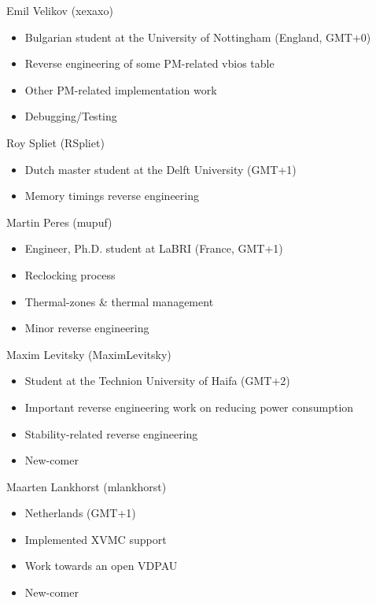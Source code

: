 \documentclass[11pt,english,compress]{beamer}
\begin{document}
		\begin{frame}
			\begin{block}{Emil Velikov (xexaxo)}
				\begin{itemize}
					\item Bulgarian student at the University of Nottingham (England, GMT+0)
					\item Reverse engineering of some PM-related vbios table
					\item Other PM-related implementation work
					\item Debugging/Testing
				\end{itemize}
			\end{block}

			\begin{block}{Roy Spliet (RSpliet)}
				\begin{itemize}
					\item Dutch master student at the Delft University (GMT+1)
					\item Memory timings reverse engineering
				\end{itemize}
			\end{block}
		\end{frame}

		\begin{frame}
			\begin{block}{Martin Peres (mupuf)}
				\begin{itemize}
					\item Engineer, Ph.D. student at LaBRI (France, GMT+1)
					\item Reclocking process
					\item Thermal-zones \& thermal management
					\item Minor reverse engineering
				\end{itemize}
			\end{block}

			\begin{block}{Maxim Levitsky (MaximLevitsky)}
				\begin{itemize}
					\item Student at the Technion University of Haifa (GMT+2)
					\item Important reverse engineering work on reducing power consumption
					\item Stability-related reverse engineering
					\item New-comer
				\end{itemize}
			\end{block}
		\end{frame}

		\begin{frame}
			\begin{block}{Maarten Lankhorst (mlankhorst)}
				\begin{itemize}
					\item Netherlands (GMT+1)
					\item Implemented XVMC support
					\item Work towards an open VDPAU
					\item New-comer
				\end{itemize}
			\end{block}
		\end{frame}
\end{document}
